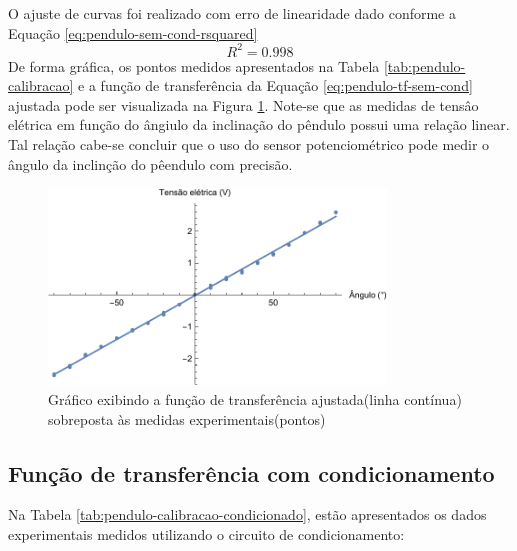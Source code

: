\documentclass[a4paper]{instrumentacao}
\begin{document}
O ajuste de curvas foi realizado com erro de linearidade dado conforme a Equação \ref{eq:pendulo-sem-cond-rsquared}
%
\begin{equation}
	R^2 = 0.998
	\label{eq:pendulo-sem-cond-rsquared}
\end{equation}
%
De forma gráfica, os pontos medidos apresentados na Tabela \ref{tab:pendulo-calibracao} e a função de transferência da Equação \ref{eq:pendulo-tf-sem-cond} ajustada pode ser visualizada na Figura \ref{fig:pendulo-tf-sem-cond}. Note-se que as medidas de tensâo elétrica em função do ângiulo da inclinação do pêndulo possui uma relação linear. Tal relação cabe-se concluir que o uso do sensor potenciométrico pode medir o ângulo da inclinção do pêendulo com precisão.

\begin{figure}[]
\centering
\includegraphics[width=0.8\textwidth]{Pendulo-fit.pdf}
\caption{Gráfico exibindo a função de transferência ajustada(linha contínua) sobreposta às medidas experimentais(pontos)}
\label{fig:pendulo-tf-sem-cond}
\end{figure}

\subsection{Função de transferência com condicionamento}

Na Tabela \ref{tab:pendulo-calibracao-condicionado}, estão apresentados os dados experimentais medidos utilizando o circuito de condicionamento:
\end{document}
